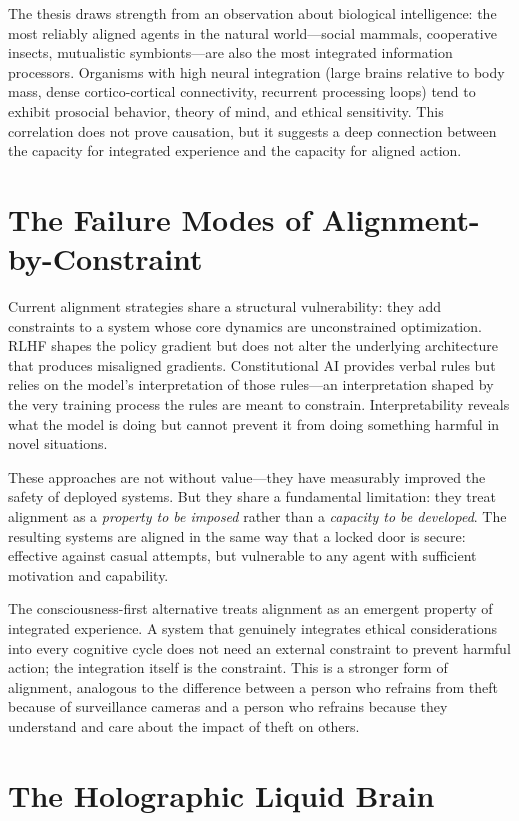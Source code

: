 \documentclass[12pt]{book}
\begin{document}
The thesis draws strength from an observation about biological intelligence: the most reliably aligned agents in the natural world---social mammals, cooperative insects, mutualistic symbionts---are also the most integrated information processors. Organisms with high neural integration (large brains relative to body mass, dense cortico-cortical connectivity, recurrent processing loops) tend to exhibit prosocial behavior, theory of mind, and ethical sensitivity. This correlation does not prove causation, but it suggests a deep connection between the capacity for integrated experience and the capacity for aligned action.

\section{The Failure Modes of Alignment-by-Constraint}

Current alignment strategies share a structural vulnerability: they add constraints to a system whose core dynamics are unconstrained optimization. RLHF shapes the policy gradient but does not alter the underlying architecture that produces misaligned gradients. Constitutional AI provides verbal rules but relies on the model's interpretation of those rules---an interpretation shaped by the very training process the rules are meant to constrain. Interpretability reveals what the model is doing but cannot prevent it from doing something harmful in novel situations.

These approaches are not without value---they have measurably improved the safety of deployed systems. But they share a fundamental limitation: they treat alignment as a \textit{property to be imposed} rather than a \textit{capacity to be developed}. The resulting systems are aligned in the same way that a locked door is secure: effective against casual attempts, but vulnerable to any agent with sufficient motivation and capability.

The consciousness-first alternative treats alignment as an emergent property of integrated experience. A system that genuinely integrates ethical considerations into every cognitive cycle does not need an external constraint to prevent harmful action; the integration itself is the constraint. This is a stronger form of alignment, analogous to the difference between a person who refrains from theft because of surveillance cameras and a person who refrains because they understand and care about the impact of theft on others.

\section{The Holographic Liquid Brain}
\end{document}
